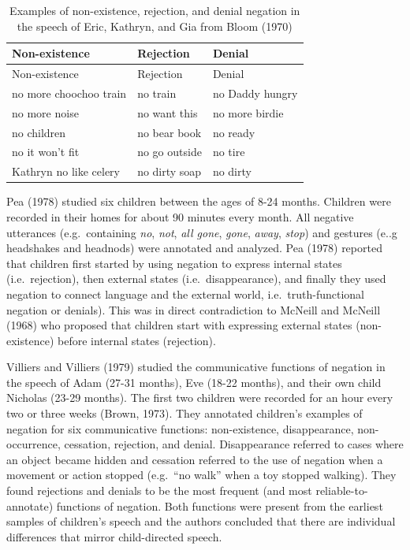 \documentclass[
  english,
  man,floatsintext]{apa6}
\begin{document}
\begin{longtable}[]{@{}lll@{}}
\caption{\label{tab:bloom} Examples of non-existence, rejection, and denial negation in the speech of Eric, Kathryn, and Gia from Bloom (1970)}\tabularnewline
\toprule
Non-existence & Rejection & Denial \\
\midrule
\endfirsthead
\toprule
Non-existence & Rejection & Denial \\
\midrule
\endhead
no more choochoo train & no train & no Daddy hungry \\
no more noise & no want this & no more birdie \\
no children & no bear book & no ready \\
no it won't fit & no go outside & no tire \\
Kathryn no like celery & no dirty soap & no dirty \\
\bottomrule
\end{longtable}

Pea (1978) studied six children between the ages of 8-24 months. Children were recorded in their homes for about 90 minutes every month. All negative utterances (e.g.~containing \emph{no}, \emph{not}, \emph{all gone}, \emph{gone}, \emph{away}, \emph{stop}) and gestures (e..g headshakes and headnods) were annotated and analyzed. Pea (1978) reported that children first started by using negation to express internal states (i.e.~rejection), then external states (i.e.~disappearance), and finally they used negation to connect language and the external world, i.e.~truth-functional negation or denials). This was in direct contradiction to McNeill and McNeill (1968) who proposed that children start with expressing external states (non-existence) before internal states (rejection).

Villiers and Villiers (1979) studied the communicative functions of negation in the speech of Adam (27-31 months), Eve (18-22 months), and their own child Nicholas (23-29 months). The first two children were recorded for an hour every two or three weeks (Brown, 1973). They annotated children's examples of negation for six communicative functions: non-existence, disappearance, non-occurrence, cessation, rejection, and denial. Disappearance referred to cases where an object became hidden and cessation referred to the use of negation when a movement or action stopped (e.g.~``no walk'' when a toy stopped walking). They found rejections and denials to be the most frequent (and most reliable-to-annotate) functions of negation. Both functions were present from the earliest samples of children's speech and the authors concluded that there are individual differences that mirror child-directed speech.
\end{document}
